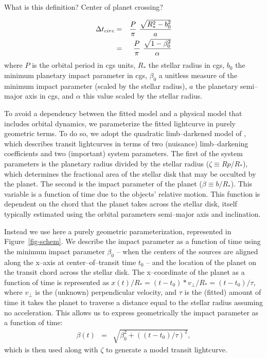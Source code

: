 \medskip
{\centerline{}}
\smallskip

What is this definition?  Center of planet crossing?

\begin{eqnarray}
\Delta t_{circ} & = & {{P}\over{\pi}}~{{\sqrt{R_*^2 - b_0^2}}\over{a}} \nonumber \\
                & = & {{P}\over{\pi}}~{{\sqrt{1 - \beta_0^2}}\over{\alpha}}
\label{eq-tcirc}
\end{eqnarray}
where $P$ is the orbital period in cgs units, $R_*$ the stellar radius
in cgs, $b_0$ the minimum planetary impact parameter in cgs, $\beta_0$
a unitless measure of the minimum impact parameter (scaled by the
stellar radius), $a$ the planetary semi--major axis in cgs, and
$\alpha$ this value scaled by the stellar radius.


\medskip
{\centerline{}}
\smallskip

To avoid a dependency between the fitted model and a physical model
that includes orbital dynamics, we parameterize the fitted lightcurve
in purely geometric terms.  To do so, we adopt the quadratic
limb--darkened model of \cite{2002ApJ...580L.171M}, which describes
transit lightcurves in terms of two (nuisance) limb--darkening
coefficients and two (important) system parameters.  The first of the
system parameters is the planetary radius divided by the stellar
radius ($\zeta \equiv Rp/R_*$), which determines the fractional area
of the stellar disk that may be occulted by the planet.  The second is
the impact parameter of the planet ($\beta \equiv b/R_*$).  This
variable is a function of time due to the objects' relative motion.
This function is dependent on the chord that the planet takes across
the stellar disk, itself typically estimated using the orbital
parameters semi--major axis and inclination.

Instead we use here a purely geometric parameterization, represented
in Figure~\ref{fig-schem}.  We describe the impact parameter as a
function of time using the minimum impact parameter $\beta_0$ -- when
the centers of the sources are aligned along the x--axis at
center--of--transit time $t_0$ -- and the location of the planet on
the transit chord across the stellar disk.  The x--coordinate of the
planet as a function of time is represented as $x(t) / R_* = (t - t_0)
* v_\perp / R_* = (t - t_0) / \tau$, where $v_\perp$ is the (unknown)
perpendicular velocity, and $\tau$ is the (fitted) amount of time it
takes the planet to traverse a distance equal to the stellar radius
assuming no acceleration.  This allows us to express geometrically the
impact parameter as a function of time:
\begin{eqnarray}
\beta(t) & = & \sqrt{\beta_0^2 + \left((t - t_0) / \tau\right)^2},
\end{eqnarray}
which is then used along with $\zeta$ to generate a model transit
lightcurve.

